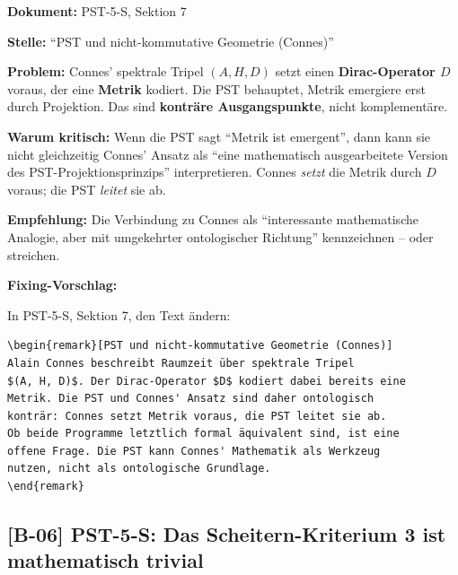 \documentclass[11pt,a4paper]{article}
\newcommand{\B}[1]{\textbf{[B-#1]}}
\newcommand{\Dok}[1]{\noindent\textbf{Dokument:} #1\par\smallskip}
\newcommand{\Stelle}[1]{\noindent\textbf{Stelle:} #1\par\smallskip}
\newcommand{\Prob}[1]{\noindent\textbf{Problem:} #1\par\smallskip}
\newcommand{\Krit}[1]{\noindent\textbf{Warum kritisch:} #1\par\smallskip}
\newcommand{\Empf}[1]{\noindent\textbf{Empfehlung:} #1\par\smallskip}
\newenvironment{Fix}
  {\par\medskip\noindent\textbf{Fixing-Vorschlag:}\par\nobreak\smallskip}
  {\par\medskip}
\begin{document}
\Dok{PST-5-S, Sektion 7}
\Stelle{``PST und nicht-kommutative Geometrie (Connes)''}
\Prob{Connes' spektrale Tripel $(A, H, D)$ setzt einen
\textbf{Dirac-Operator $D$} voraus, der eine \textbf{Metrik} kodiert.
Die PST behauptet, Metrik emergiere erst durch Projektion. Das sind
\textbf{konträre Ausgangspunkte}, nicht komplementäre.}
\Krit{Wenn die PST sagt ``Metrik ist emergent'', dann kann sie
nicht gleichzeitig Connes' Ansatz als ``eine mathematisch
ausgearbeitete Version des PST-Projektionsprinzips'' interpretieren.
Connes \emph{setzt} die Metrik durch $D$ voraus; die PST
\emph{leitet} sie ab.}
\Empf{Die Verbindung zu Connes als ``interessante mathematische
Analogie, aber mit umgekehrter ontologischer Richtung''
kennzeichnen -- oder streichen.}
\begin{Fix}
In PST-5-S, Sektion 7, den Text ändern:
\begin{verbatim}
\begin{remark}[PST und nicht-kommutative Geometrie (Connes)]
Alain Connes beschreibt Raumzeit über spektrale Tripel
$(A, H, D)$. Der Dirac-Operator $D$ kodiert dabei bereits eine
Metrik. Die PST und Connes' Ansatz sind daher ontologisch
konträr: Connes setzt Metrik voraus, die PST leitet sie ab.
Ob beide Programme letztlich formal äquivalent sind, ist eine
offene Frage. Die PST kann Connes' Mathematik als Werkzeug
nutzen, nicht als ontologische Grundlage.
\end{remark}
\end{verbatim}
\end{Fix}

\subsection{\B{06} PST-5-S: Das Scheitern-Kriterium 3 ist mathematisch trivial}
\end{document}
